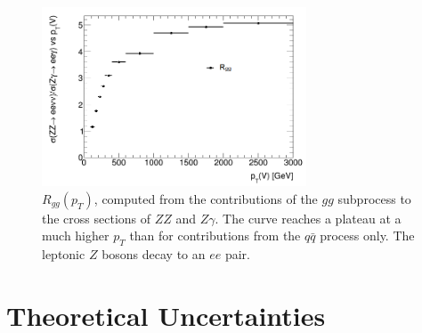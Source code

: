 \documentclass[12pt,a4paper,openright,twoside]{report}
\begin{document}
\begin{figure}[H]
\centering
\includegraphics[width=0.7\textwidth]{Rgg.png}
\caption{$R_{gg}(p_T)$, computed from the contributions of the $gg$ subprocess to the cross sections of $ZZ$ and $Z\gamma$. The curve reaches a plateau at a much higher $p_T$ than for contributions from the $q\bar{q}$ process only. The leptonic $Z$ bosons decay to an $ee$ pair.}
\label{fig:R_ggonly}
\end{figure}
\vfill
\section{Theoretical Uncertainties}
\end{document}
